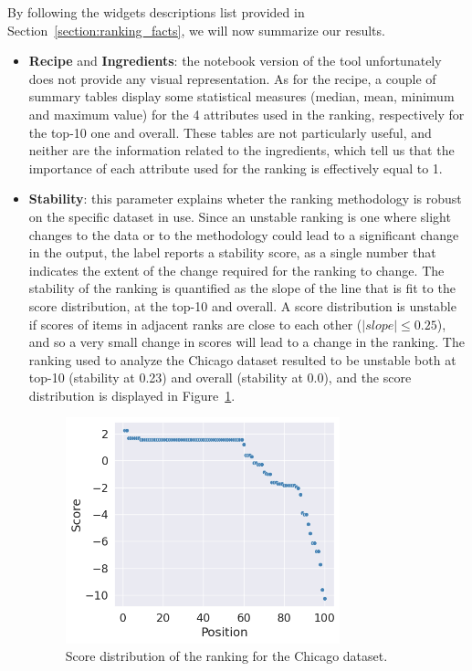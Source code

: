 By following the widgets descriptions list provided in Section~\ref{section:ranking_facts}, we will now summarize our results.
\begin{itemize}
\item \textbf{Recipe} and \textbf{Ingredients}: the notebook version of the tool unfortunately does not provide any visual representation. As for the recipe, a couple of summary tables display some statistical measures (median, mean, minimum and maximum value) for the 4 attributes used in the ranking, respectively for the top-10 one and overall. These tables are not particularly useful, and neither are the information related to the ingredients, which tell us that the importance of each attribute used for the ranking is effectively equal to 1.
\item \textbf{Stability}: this parameter explains wheter the ranking methodology is robust on the specific dataset in use. Since an unstable ranking is one where slight changes to the data or to the methodology could lead to a significant change in the output, the label reports a stability score, as a single number that indicates the extent of the change required for the ranking to change. The stability of the ranking is quantified as the slope of the line that is fit to the score distribution, at the top-10 and overall. A score distribution is unstable if scores of items in adjacent ranks are close to each other (\(|\mathit{slope}| \leq 0.25\)), and so a very small change in scores will lead to a change in the ranking. The ranking used to analyze the Chicago dataset resulted to be unstable both at top-10 (stability at 0.23) and overall (stability at 0.0), and the score distribution is displayed in Figure~\ref{fig:chicago_rankingfacts2}.

\begin{figure}[h!]
\centering
\includegraphics[width=0.75\textwidth]{figures/chicago_rankingfacts2.png}
\caption{Score distribution of the ranking for the Chicago dataset.}
\label{fig:chicago_rankingfacts2}
\end{figure}


\end{itemize}
